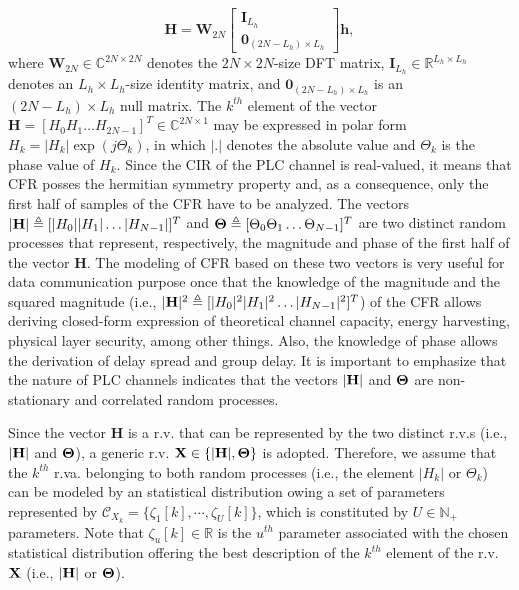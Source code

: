 \begin{equation}
\mathbf{H} = \mathbf{W}_{2N}  \begin{bmatrix} \mathbf{I}_{L_h} \\ \mathbf{0}_{(2N-L_{h})\times L_{h}} \end{bmatrix} \mathbf{h},
\end{equation}
where $\mathbf{W}_{2N} \in \mathbb{C}^{2N\times 2N}$ denotes the $2N \times 2N$-size \ac{DFT} matrix, $ \mathbf{I}_{L_h} \in \mathbb{R}^{L_h\times L_h}$ denotes an $L_h\times L_h$-size identity matrix, and $ \mathbf{0}_{(2N-L_{h})\times L_{h}} $ is an $ (2N-L_{h})\times L_{h}$ null matrix. The $k^{th}$ element of the vector $\mathbf{H}=[H_0 H_1 \ldots H_{2N-1}]^T \in \mathbb{C}^{2N\times 1}$ may be expressed in polar form $H_k=|H_k|\exp(j \Theta_k)$, in which $|.|$ denotes the absolute value and $\Theta_k$ is the phase value of $H_k$. Since the \ac{CIR} of the \ac{PLC} channel is real-valued, it means that \ac{CFR} posses the hermitian symmetry property and, as a consequence, only the first half of samples of the \ac{CFR} have to be analyzed. The vectors $|{\bf H}|\triangleq [|H_0||H_1|\ldots |H_{N-1}|]^T$ and ${\bf \Theta}\triangleq[\Theta_0\Theta_1\ldots \Theta_{N-1}]^T$ are two distinct random processes that represent, respectively, the magnitude and phase of the first half of the vector $\mathbf{H}$. The modeling of \ac{CFR} based on these two vectors is very useful for data communication purpose once that the knowledge of the magnitude and the squared magnitude (i.e.,  $|{\bf H}|^2\triangleq[|H_0|^2|H_1|^2\ldots |H_{N-1}|^2]^T$) of the \ac{CFR} allows deriving closed-form expression of theoretical channel capacity, energy harvesting, physical layer security, among other things. Also, the knowledge of phase allows the derivation of delay spread and group delay. It is important to emphasize that the nature of \ac{PLC} channels indicates that the vectors $|{\bf H}|$ and ${\bf \Theta}$ are non-stationary and correlated random processes. 
 
Since the vector $\mathbf{H}$ is a \ac{r.v.} that can be represented by the  two distinct \acp{r.v.} (i.e., $|{\bf H}|$ and ${\bf \Theta}$), a generic \ac{r.v.} $\bf X\in\{|H|,\Theta\}$ is adopted. Therefore, we assume that the $k^{th}$ \ac{r.va.} belonging to both random processes (i.e., the element $|H_k|$ or $\Theta_k$) can be modeled by an statistical distribution owing a set of parameters represented by $\mathcal{C}_{X_k} = \{ \zeta_{1}[k], \cdots, \zeta_{U}[k] \}$, which is constituted by $U \in \mathbb{N}_+$ parameters. Note that $\zeta_{u}[k] \in \mathbb{R}$ is the $u^{th}$ parameter associated with the chosen statistical distribution offering the best description of the $k^{th}$ element of the \ac{r.v.} $\bf X$ (i.e., $|{\bf H}|$ or ${\bf \Theta}$).

